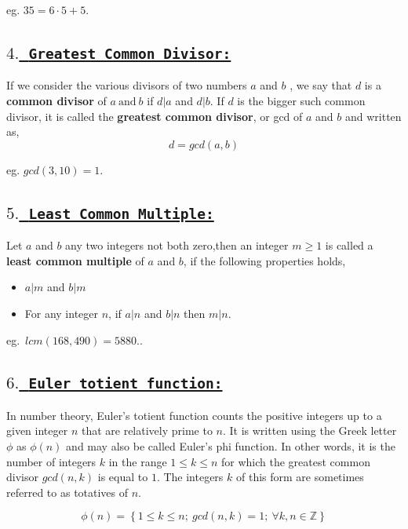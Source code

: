 \documentclass[a4paper,12pt]{article}
\begin{document}
    eg. $35 = 6\cdot 5 + 5$.

    \subsection*{\underline{$4.$\ \texttt{\textbf{Greatest Common Divisor:}}}}

    If we consider the various divisors of two numbers $a$ and $b$ , we say that $d$ is a {\bf common divisor} of $a\  \mbox{and}\ b$ if $d|a$ and $d|b$. If $d$ is the bigger such common divisor, it is called the {\bf greatest common divisor}, or gcd of $a$ and $b$ and written as,
    $$d = gcd(a,b)$$
    
    eg.  $gcd(3,10) = 1$.

    \subsection*{\underline{$5.$\ \texttt{\textbf{Least Common Multiple:}}}}

    Let $a$ and $b$ any two integers not both zero,then an integer $m\geq 1$ is called a {\bf least common multiple} of $a$ and $b$, if the following properties holds,
        \begin{itemize}
            \item $a|m$ and $b|m$
            \item For any integer $n$, if $a|n$ and $b|n$ then $m|n$.
        \end{itemize}
    
        eg.\ $lcm(168,490) = 5880.$.

    \subsection*{\underline{$6.$\ \texttt{\textbf{Euler totient function:}}}}    

    In number theory, Euler's totient function counts the positive integers up to a given integer $n$ that are relatively prime to $n$. It is written using the Greek letter $\phi$ as $\phi(n)$ and may also be called Euler's phi function. In other words, it is the number of integers $k$ in the range $1 \leq k \leq n$ for which the greatest common divisor $gcd(n, k)$ is equal to $1$. The integers $k$ of this form are sometimes referred to as totatives of $n$.
    
    $$\phi(n) = \left\{1\leq k \leq n ;\ gcd(n,k) = 1 ;\ \forall k,n\in \mathbb{Z}\right\}$$

    \vspace*{1.5cm}
\end{document}
